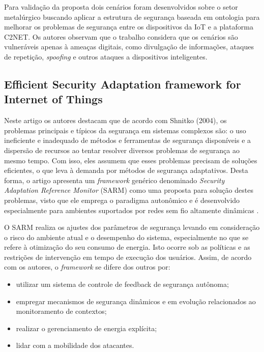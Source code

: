 \documentclass[tid,table]{texufpel} %
\begin{document}
Para validação da proposta dois cenários foram desenvolvidos sobre o setor metalúrgico buscando aplicar a estrutura de segurança baseada em ontologia para melhorar os problemas de segurança entre os dispositivos da IoT e a plataforma C2NET. Os autores observam que o trabalho considera que os cenários são vulneráveis apenas à ameaças digitais, como divulgação de informações, ataques de repetição, \textit{spoofing} e outros ataques a dispositivos inteligentes.

\subsection{Efficient Security Adaptation framework for Internet of Things} %

Neste artigo os autores destacam que de acordo com Shnitko (2004)\nocite{shnitko04}, os problemas principais e típicos da segurança em sistemas complexos são: o uso ineficiente e inadequado de métodos e ferramentas de segurança disponíveis e a dispersão de recursos ao tentar resolver diversos problemas de segurança ao mesmo tempo. Com isso, eles assumem que esses problemas precisam de soluções eficientes, o que leva à demanda por métodos de segurança adaptativos. Desta forma, o artigo apresenta um \textit{framework} genérico denominado \textit{Security Adaptation Reference Monitor} (SARM) como uma proposta para solução destes problemas, visto que ele emprega o paradigma autonômico e é desenvolvido especialmente para ambientes suportados por redes sem fio altamente dinâmicas \cite{elmaliki16}.

O SARM realiza os ajustes dos parâmetros de segurança levando em consideração o risco do ambiente atual e o desempenho do sistema, especialmente no que se refere à otimização do seu consumo de energia. Isto ocorre sob as políticas e as restrições de intervenção em tempo de execução dos usuários. Assim, de acordo com os autores, o \textit{framework} se difere dos outros por:

\begin{itemize}
\item utilizar um sistema de controle de feedback de segurança autônoma;
\item empregar mecanismos de segurança dinâmicos e em evolução relacionados ao monitoramento de contextos;
\item realizar o gerenciamento de energia explícita;
\item lidar com a mobilidade dos atacantes.
\end{itemize}
\end{document}
